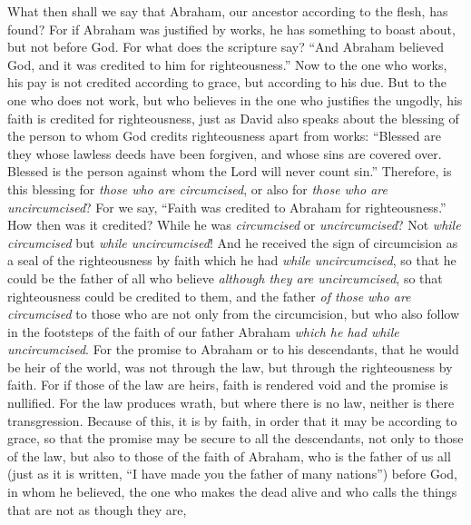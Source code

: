\begin{biblechapter} %
 What then shall we say that Abraham, our ancestor according to the flesh, has found?
\verse For if Abraham was justified by works, he has something to boast about, but not before God.
\verse For what does the scripture say? “And Abraham believed God, and it was credited to him for righteousness.”
\verse Now to the one who works, his pay is not credited according to grace, but according to his due.
\verse But to the one who does not work, but who believes in the one who justifies the ungodly, his faith is credited for righteousness,
\verse just as David also speaks about the blessing of the person to whom God credits righteousness apart from works:
\verse “Blessed are they whose lawless deeds have been forgiven, 
and whose sins are covered over.
\verse Blessed is the person against whom the Lord will never count sin.”
\verse Therefore, is this blessing for \textit{those who are circumcised}, or also for \textit{those who are uncircumcised}? For we say, “Faith was credited to Abraham for righteousness.”
\verse How then was it credited? While he was \textit{circumcised} or \textit{uncircumcised}? Not \textit{while circumcised} but \textit{while uncircumcised}!
\verse And he received the sign of circumcision as a seal of the righteousness by faith which he had \textit{while uncircumcised}, so that he could be the father of all who believe \textit{although they are uncircumcised}, so that righteousness could be credited to them,
\verse and the father \textit{of those who are circumcised} to those who are not only from the circumcision, but who also follow in the footsteps of the faith of our father Abraham \textit{which he had while uncircumcised}.
 For the promise to Abraham or to his descendants, that he would be heir of the world, was not through the law, but through the righteousness by faith.
\verse For if those of the law are heirs, faith is rendered void and the promise is nullified.
\verse For the law produces wrath, but where there is no law, neither is there transgression.
\verse Because of this, it is by faith, in order that it may be according to grace, so that the promise may be secure to all the descendants, not only to those of the law, but also to those of the faith of Abraham, who is the father of us all
\verse (just as it is written, “I have made you the father of many nations”) before God, in whom he believed, the one who makes the dead alive and who calls the things that are not as though they are,

\end{biblechapter}
